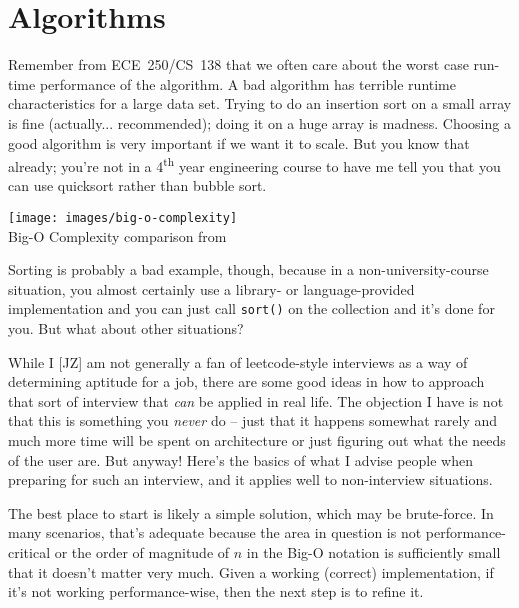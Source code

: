 




\section*{Algorithms}
Remember from ECE~250/CS~138 that we often care about the worst case run-time performance of the algorithm. A bad algorithm has terrible runtime characteristics for a large data set. Trying to do an insertion sort on a small array is fine (actually... recommended); doing it on a huge array is madness. Choosing a good algorithm is very important if we want it to scale.  But you know that already; you're not in a 4\textsuperscript{th} year engineering course to have me tell you that you can use quicksort rather than bubble sort.

\begin{center}
	\texttt{[image: images/big-o-complexity]}\\
	Big-O Complexity comparison from ~\cite{bigocheatsheet}
\end{center}

Sorting is probably a bad example, though, because in a non-university-course situation, you almost certainly use a library- or language-provided implementation and you can just call \texttt{sort()} on the collection and it's done for you. But what about other situations?

While I [JZ] am not generally a fan of leetcode-style interviews as a way of determining aptitude for a job, there are some good ideas in how to approach that sort of interview that \textit{can} be applied in real life. The objection I have is not that this is something you \textit{never} do -- just that it happens somewhat rarely and much more time will be spent on architecture or just figuring out what the needs of the user are. But anyway! Here's the basics of what I advise people when preparing for such an interview, and it applies well to non-interview situations.

The best place to start is likely a simple solution, which may be brute-force. In many scenarios, that's adequate because the area in question is not performance-critical or the order of magnitude of $n$ in the Big-O notation is sufficiently small that it doesn't matter very much. Given a working (correct) implementation, if it's not working performance-wise, then the next step is to refine it. 


